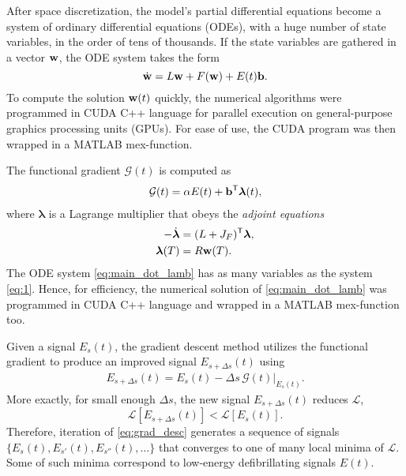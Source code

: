 \documentclass{article}
\newcommand{\tp}{\mathsf{T}}
\begin{document}
After space discretization, the model's partial differential equations become a system of ordinary differential equations (ODEs), with a huge number of state variables, in the order of tens of thousands. If the state variables are gathered in a vector ${\bf w}$, the ODE system takes the form
\begin{equation}
  \label{eq:1}
  \dot{\bf w} = L{\bf w} + F({\bf w}) + E(t){\bf b}.  
\end{equation}
To compute the solution ${\bf w}(t)$ quickly, the numerical algorithms were programmed in CUDA C++ language for parallel execution on general-purpose graphics processing units (GPUs). For ease of use, the CUDA program was then wrapped in a MATLAB mex-function.

The functional gradient $\mathcal{G}(t)$ is computed as
\begin{align}
   \mathcal{G}(t) = \alpha E(t) + {\bf b}^\tp\bm{\lambda}(t),
\end{align}
where $\bm{\lambda}$ is a Lagrange multiplier that obeys the {\it adjoint equations}
\begin{subequations}
  \label{eq:main_ivp_lamb}
  \begin{align}
    \label{eq:main_dot_lamb}
    -\dot{\bm{\lambda}} &= (L+J_F)^\tp \bm{\lambda}, \\
    \label{eq:main_lambT}
    \bm{\lambda}(T) &= R{\bf w}(T).
  \end{align}
\end{subequations}
The ODE system \eqref{eq:main_dot_lamb} has as many variables as the system \eqref{eq:1}. Hence, for efficiency, the numerical solution of \eqref{eq:main_dot_lamb} was programmed in CUDA C++ language and wrapped in a MATLAB mex-function too.


Given a signal $E_s(t)$, the gradient descent method utilizes the functional gradient to produce an improved signal $E_{s+\Delta s}(t)$ using
\begin{align}
  \label{eq:grad_desc}
  E_{s+\Delta s}(t) = E_s(t) - \Delta s\, \mathcal{G}(t)|_{E_s(t)}.
  \end{align}
  More exactly, for small enough $\Delta s$, the new signal $E_{s+\Delta s}(t)$ reduces $\mathcal{L}$,
  \begin{equation*}
    \mathcal{L}[E_{s+\Delta s}(t)] < \mathcal{L}[E_s(t)].
  \end{equation*}
  Therefore, iteration of \eqref{eq:grad_desc} generates a sequence of signals $\{E_s(t), E_{s'}(t), E_{s''}(t),\ldots\}$ that converges to one of many local minima of $\mathcal{L}$. Some of such minima correspond to low-energy defibrillating signals $E(t)$.
\end{document}
